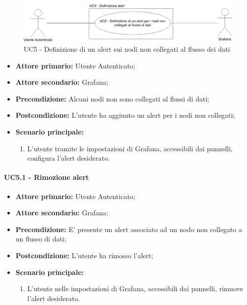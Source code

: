 \begin{figure}[H]
	\centering
	\includegraphics[scale=0.3]{./images/UC5.png}
	\caption{UC5 - Definizione di un alert sui nodi non collegati al flusso dei dati}
\end{figure}

\begin{itemize}
	\item \textbf{Attore primario:} Utente Autenticato;
	\item \textbf{Attore secondario:} Grafana;
	\item \textbf{Precondizione:} Alcuni nodi non sono collegati al flussi di dati;
	\item \textbf{Postcondizione:} L'utente ha aggiunto un alert per i nodi non collegati;
	\item \textbf{Scenario principale:}
	\begin{enumerate}
		\item L'utente tramite le impostazioni di Grafana, accessibili dai pannelli, configura l'alert desiderato.
	\end{enumerate}
\end{itemize}

\paragraph{UC5.1 - Rimozione alert}\label{UC5.1}
\begin{itemize}
	\item \textbf{Attore primario:} Utente Autenticato;
	\item \textbf{Attore secondario:} Grafana;
	\item \textbf{Precondizione:} E' presente un alert associato ad un nodo non collegato a un flusso di dati;
	\item \textbf{Postcondizione:} L'utente ha rimosso l'alert;
	\item \textbf{Scenario principale:}
	\begin{enumerate}
		\item L'utente nelle impostazioni di Grafana, accessibili dai pannelli, rimuove l'alert desiderato.
	\end{enumerate}
\end{itemize}

